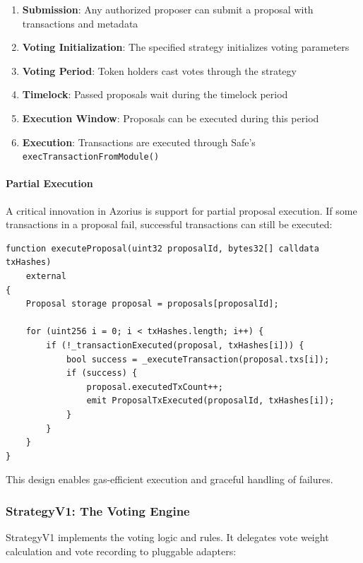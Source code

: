 \documentclass[11pt,a4paper]{article}
\begin{document}
\begin{enumerate}
    \item \textbf{Submission}: Any authorized proposer can submit a proposal with transactions and metadata
    \item \textbf{Voting Initialization}: The specified strategy initializes voting parameters
    \item \textbf{Voting Period}: Token holders cast votes through the strategy
    \item \textbf{Timelock}: Passed proposals wait during the timelock period
    \item \textbf{Execution Window}: Proposals can be executed during this period
    \item \textbf{Execution}: Transactions are executed through Safe's \texttt{execTransactionFromModule()}
\end{enumerate}

\paragraph{Partial Execution}

A critical innovation in Azorius is support for partial proposal execution. If some transactions in a proposal fail, successful transactions can still be executed:

\begin{lstlisting}[caption=Partial Execution Logic]
function executeProposal(uint32 proposalId, bytes32[] calldata txHashes)
    external
{
    Proposal storage proposal = proposals[proposalId];

    for (uint256 i = 0; i < txHashes.length; i++) {
        if (!_transactionExecuted(proposal, txHashes[i])) {
            bool success = _executeTransaction(proposal.txs[i]);
            if (success) {
                proposal.executedTxCount++;
                emit ProposalTxExecuted(proposalId, txHashes[i]);
            }
        }
    }
}
\end{lstlisting}

This design enables gas-efficient execution and graceful handling of failures.

\subsubsection{StrategyV1: The Voting Engine}

StrategyV1 implements the voting logic and rules. It delegates vote weight calculation and vote recording to pluggable adapters:
\end{document}
